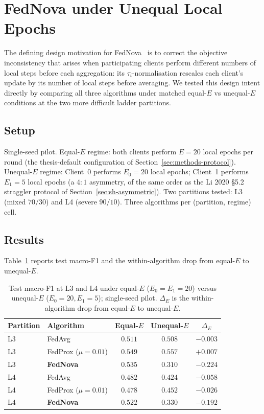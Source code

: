 \documentclass[11pt,a4paper]{report}
\begin{document}
\section{FedNova under Unequal Local Epochs}
\label{sec:fednova-unequal-e}

The defining design motivation for FedNova~\citep{wang2020fednova} is to
correct the objective inconsistency that arises when participating clients
perform different numbers of local steps before each aggregation: its
$\tau_i$-normalisation rescales each client's update by its number of
local steps before averaging. We tested this design intent directly by
comparing all three algorithms under matched equal-$E$ vs unequal-$E$
conditions at the two more difficult ladder partitions.

\subsection{Setup}
Single-seed pilot. Equal-$E$ regime: both clients perform $E = 20$ local
epochs per round (the thesis-default configuration of
Section~\ref{sec:methods-protocol}). Unequal-$E$ regime: Client~0 performs
$E_0 = 20$ local epochs; Client~1 performs $E_1 = 5$ local epochs (a $4{:}1$
asymmetry, of the same order as the Li 2020 §5.2 straggler protocol of
Section~\ref{sec:sh-asymmetric}). Two partitions tested: L3 (mixed
$70/30$) and L4 (severe $90/10$). Three algorithms per (partition,
regime) cell.

\subsection{Results}
Table~\ref{tab:fednova-unequal-e} reports test macro-F1 and the
within-algorithm drop from equal-$E$ to unequal-$E$.

\begin{table}[!htbp]
\centering
\caption{Test macro-F1 at L3 and L4 under equal-$E$ ($E_0 = E_1 = 20$)
versus unequal-$E$ ($E_0 = 20, E_1 = 5$); single-seed pilot.
$\Delta_E$ is the within-algorithm drop from equal-$E$ to
unequal-$E$.}
\label{tab:fednova-unequal-e}
\small
\begin{tabular}{llccc}
\toprule
Partition & Algorithm & Equal-$E$ & Unequal-$E$ & $\Delta_E$ \\
\midrule
L3 & FedAvg                  & $0.511$ & $0.508$ & $-0.003$ \\
L3 & FedProx ($\mu = 0.01$)  & $0.549$ & $0.557$ & $+0.007$ \\
L3 & \textbf{FedNova}        & $\mathbf{0.535}$ & $\mathbf{0.310}$ & $\mathbf{-0.224}$ \\
\midrule
L4 & FedAvg                  & $0.482$ & $0.424$ & $-0.058$ \\
L4 & FedProx ($\mu = 0.01$)  & $0.478$ & $0.452$ & $-0.026$ \\
L4 & \textbf{FedNova}        & $\mathbf{0.522}$ & $\mathbf{0.330}$ & $\mathbf{-0.192}$ \\
\bottomrule
\end{tabular}
\end{table}
\end{document}
